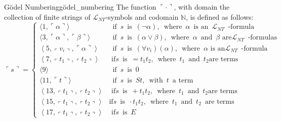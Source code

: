 \begin{definition}
{Gödel Numbering}{gödel_numbering} The function \(\ulcorner \cdot \urcorner\), with
domain the collection of finite strings of \(\mathcal{L}_{N T}\)-symbols and
codomain \(\mathbb{N}\), is defined as follows: 
\[
\ulcorner s\urcorner =
\begin{cases} 
\langle 1,\ulcorner\alpha\urcorner\rangle & \enspace \text{if}
\enspace s \enspace \text{is} \enspace(\neg \alpha), \enspace \text{where}
\enspace \alpha \enspace \text{is an} \enspace \mathcal{L}_{N T} \enspace
\text{-formula} \enspace \\ \langle
3,\ulcorner\alpha\urcorner,\ulcorner\beta\urcorner\rangle & \enspace
\text{if} \enspace s \enspace \text {is} \enspace(\alpha \vee \beta),
\enspace \text{where}
\enspace \alpha \enspace \text{and} \enspace \beta \text { are}
\mathcal{L}_{N T} \enspace \text{-formulas} \enspace \\ \left\langle
5,\left\ulcorner v_{i}\right\urcorner,\ulcorner\alpha\urcorner\right\rangle &
\enspace \text{if} \enspace s \enspace \text{is} \enspace\left(\forall
v_{i}\right)(\alpha), \enspace \text{where} \enspace \alpha \text { is an}
\mathcal{L}_{N T} \enspace \text{-formula} \enspace \\ \left\langle
7,\left\ulcorner t_{1}\right\urcorner,\left\ulcorner
t_{2}\right\urcorner\right\rangle & \text { if} s \enspace \text{is} \enspace =
t_{1} t_{2}, \enspace \text{where} \enspace t_{1} \enspace \text{and} \enspace
t_{2} \text {are terms} \\ \langle 9\rangle & \enspace \text{if} \enspace s
\enspace \text{is} \enspace 0 \\ \langle 11,\ulcorner t\urcorner\rangle &
\enspace \text{if} \enspace s \enspace \text{is} \enspace S t, \enspace
\text{with} \enspace t \enspace \text{a term} \enspace \\ \left\langle
13,\left\ulcorner t_{1}\right\urcorner,\left\ulcorner
t_{2}\right\urcorner\right\rangle & \text { if} s \enspace \text{is}
\enspace+t_{1} t_{2}, \enspace \text{where} \enspace t_{1} \enspace \text{and}
\enspace t_{2} \text {are terms} \\ \left\langle 15,\left\ulcorner
t_{1}\right\urcorner,\left\ulcorner t_{2}\right\urcorner\right\rangle & \text {
if} s \enspace \text{is} \enspace \cdot t_{1} t_{2}, \enspace \text{where}
\enspace t_{1} \enspace \text{and} \enspace t_{2} \enspace \text{are terms}
\enspace \\ \left\langle 17,\left\ulcorner t_{1}\right\urcorner,\left\ulcorner
t_{2}\right\urcorner\right\rangle & \text { if} s \enspace \text{is} \enspace E

\end{cases}\]
\end{definition}
